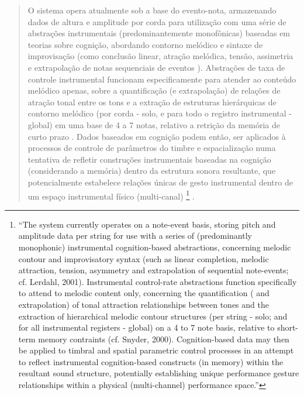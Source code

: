 \documentclass{ppgmus}
\begin{document}
\begin{quotation}
O sistema opera atualmente sob a base do evento-nota, armazenando  dados de altura e amplitude por corda para
utilização com uma série de abstrações instrumentais (predominantemente monofônicas) baseadas em teorias sobre cognição, 
abordando contorno melódico e sintaxe de improvisação (como conclusão linear, atração melódica, tensão,
assimetria e extrapolação de notas sequenciais de eventos \cite{lerdahl2001}). 
Abstrações de taxa de controle instrumental funcionam especificamente para atender ao conteúdo melódico apenas, 
sobre a quantificação (e extrapolação) de relações  de atração tonal  entre os tons e a extração de 
estruturas hierárquicas de contorno melódico (por corda - solo, e para todo o registro instrumental - global) em uma
base de 4 a 7 notas, relativo a retrição da memória de curto prazo \cite{snyder}. Dados baseados em cognição podem
então, ser aplicados à processos de controle de parâmetros do timbre e espacialização  numa tentativa de refletir 
construções instrumentais baseadas na cognição (considerando a memória) dentro da estrutura sonora resultante, 
que potencialmente estabelece relações únicas de gesto instrumental dentro de um espaço instrumental físico (multi-canal)
\footnote{
``The system currently operates on a note-event basis, storing pitch and amplitude data per string for
use with a series of (predominantly monophonic) instrumental cognition-based abstractions, concerning
melodic contour and improvisatory syntax (such as linear completion, melodic attraction, tension,
asymmetry and extrapolation of sequential note-events; cf. Lerdahl, 2001). Instrumental control-rate
abstractions function specifically to attend to melodic content only, concerning the quantification (
and extrapolation) of tonal attraction relationships between tones and the extraction of hierarchical
melodic contour structures (per string - solo; and for all instrumental registers - global) on a 4 to
7 note basis, relative to short-term memory contraints (cf. Snyder, 2000). Cognition-based data may
then be applied to timbral and spatial parametric control processes in an attempt to reflect instrumental
cognition-based constructs (in memory) within the resultant sound structure, potentially establishing
unique performance gesture relationships within a physical (multi-channel) performance space.''} \cite{rickgrahan}. 
\end{quotation}
\end{document}
